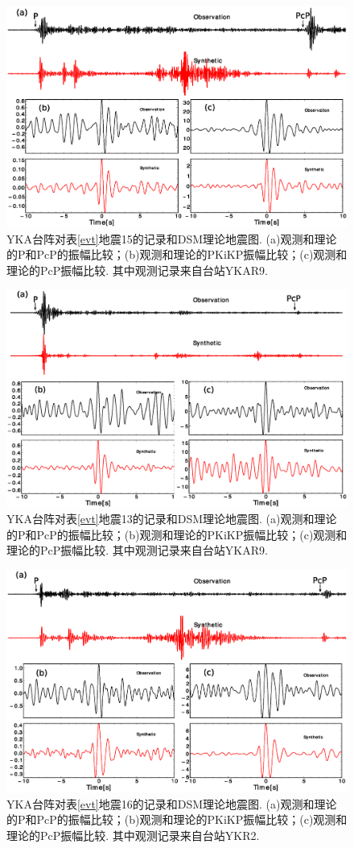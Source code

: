 \begin{figure}
\centering
\includegraphics[width=0.85\linewidth]{fig/chap3/syn_3}
\caption{YKA台阵对表\ref{evt}地震15的记录和DSM理论地震图. (a)观测和理论的P和PcP的振幅比较；(b)观测和理论的PKiKP振幅比较；(c)观测和理论的PcP振幅比较. 其中观测记录来自台站YKAR9. }
\label{fig:syn_3}
\end{figure}

\begin{figure}
\centering
\includegraphics[width=0.85\linewidth]{fig/chap3/syn_1}
\caption{YKA台阵对表\ref{evt}地震13的记录和DSM理论地震图. (a)观测和理论的P和PcP的振幅比较；(b)观测和理论的PKiKP振幅比较；(c)观测和理论的PcP振幅比较. 其中观测记录来自台站YKAR9. }
\label{fig:syn_1}
\end{figure}

\begin{figure}
\centering
\includegraphics[width=0.85\linewidth]{fig/chap3/syn_4}
\caption{YKA台阵对表\ref{evt}地震16的记录和DSM理论地震图. (a)观测和理论的P和PcP的振幅比较；(b)观测和理论的PKiKP振幅比较；(c)观测和理论的PcP振幅比较. 其中观测记录来自台站YKR2. }
\label{fig:syn_4}
\end{figure}

